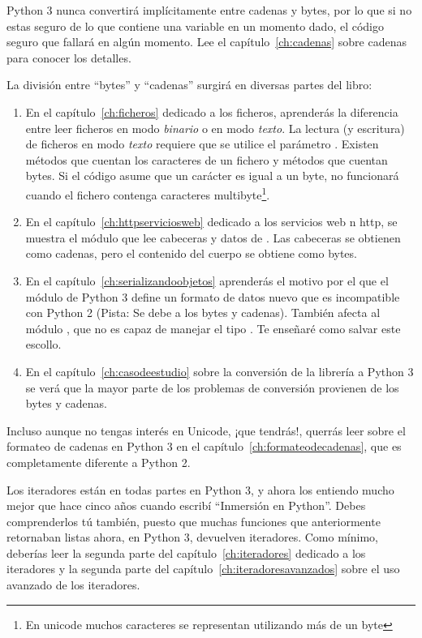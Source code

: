 Python 3 nunca convertirá implícitamente entre cadenas y bytes, por lo que si no estas seguro de lo que contiene una variable en un momento dado, el código seguro que fallará en algún momento. Lee el capítulo~\ref{ch:cadenas} sobre cadenas para conocer los detalles.

La división entre ``bytes'' y ``cadenas'' surgirá en diversas partes del libro:

\begin{enumerate}
\item En el capítulo~\ref{ch:ficheros} dedicado a los ficheros, aprenderás la diferencia entre leer ficheros en modo \emph{binario} o en modo \emph{texto}. La lectura (y escritura) de ficheros en modo \emph{texto} requiere que se utilice el parámetro . Existen métodos que cuentan los caracteres de un fichero y métodos que cuentan bytes. Si el código asume que un carácter es igual a un byte, no funcionará cuando el fichero contenga caracteres multibyte\footnote{En unicode muchos caracteres se representan utilizando más de un byte}.

\item En el capítulo~\ref{ch:httpserviciosweb} dedicado a los servicios web n http, se muestra el módulo  que lee cabeceras y datos de . Las cabeceras se obtienen como cadenas, pero el contenido del cuerpo se obtiene como bytes.

\item En el capítulo~\ref{ch:serializandoobjetos} aprenderás el motivo por el que el módulo  de Python 3 define un formato de datos nuevo que es incompatible con Python 2 (Pista: Se debe a los bytes y cadenas). También afecta al módulo , que no es capaz de manejar el tipo . Te enseñaré como salvar este escollo.

\item En el capítulo~\ref{ch:casodeestudio} sobre la conversión de la librería  a Python 3 se verá que la mayor parte de los problemas de conversión provienen de los bytes y cadenas.
\end{enumerate}

Incluso aunque no tengas interés en Unicode, ¡que tendrás!, querrás leer sobre el formateo de cadenas en Python 3 en el capítulo~\ref{ch:formateodecadenas}, que es completamente diferente a Python 2.

Los iteradores están en todas partes en Python 3, y ahora los entiendo mucho mejor que hace cinco años cuando escribí ``Inmersión en Python''. Debes comprenderlos tú también, puesto que muchas funciones que anteriormente retornaban listas ahora, en Python 3, devuelven iteradores. Como mínimo, deberías leer la segunda parte del capítulo~\ref{ch:iteradores} dedicado a los iteradores y la segunda parte del capítulo~\ref{ch:iteradoresavanzados} sobre el uso avanzado de los iteradores.

